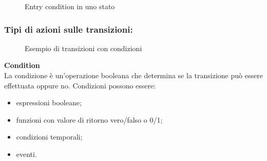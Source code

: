 \documentclass{article}
\begin{document}
                \begin{figure} [ht]
                    \caption{Entry condition in uno stato}
                    \label{fig:entry}
                \end{figure}
                    
            \subsubsection{Tipi di azioni sulle transizioni:}

                \begin{figure} [ht]
                    \caption{Esempio di transizioni con condizioni}
                    \label{fig:my_label}
                \end{figure}
                    
                \textbf{Condition}\\
                La condizione è un’operazione booleana che determina se la transizione può essere effettuata oppure no. Condizioni possono essere:\\
                \begin{itemize}
                    \item espressioni booleane;\\
                    \item funzioni con valore di ritorno vero/falso o 0/1;\\
                    \item condizioni temporali;\\
                    \item eventi.
                \end{itemize}
                
\end{document}
